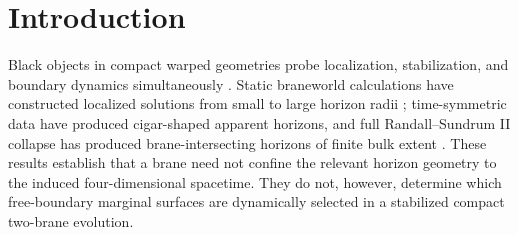 \documentclass[11pt]{article}
\begin{document}
\section{Introduction}

Black objects in compact warped geometries probe localization,
stabilization, and boundary dynamics simultaneously
\cite{RandallSundrum1999,GoldbergerWise1999,DeWolfeFreedmanGubserKarch2000,TanahashiTanaka2011}.
Static braneworld calculations have constructed localized solutions from
small to large horizon radii
\cite{KudohTanakaNakamura2003,FiguerasWiseman2011}; time-symmetric data have produced
cigar-shaped apparent horizons, and full Randall--Sundrum II collapse has
produced brane-intersecting horizons of finite bulk extent
\cite{ShiromizuShibata2000,WangChoptuik2016}.  These results establish that a
brane need not confine the relevant horizon geometry to the induced
four-dimensional spacetime.  They do not, however, determine which
free-boundary marginal surfaces are dynamically selected in a stabilized
compact two-brane evolution.
\end{document}
